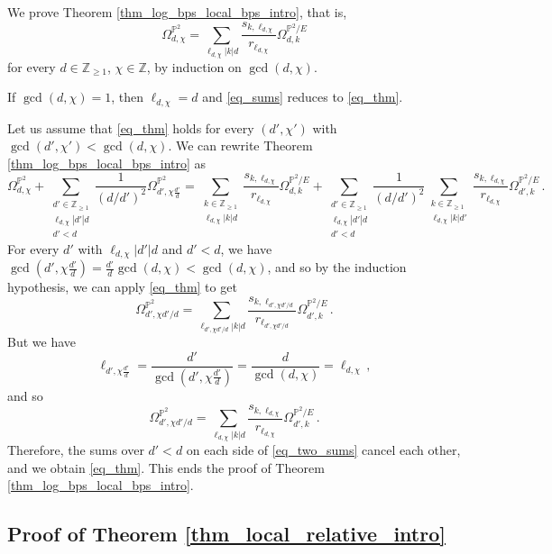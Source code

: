 \documentclass[11pt,letterpaper]{amsart}
\newcommand\PP{\mathbb P}
\newcommand\Z{\mathbb Z}
\begin{document}
We prove Theorem \ref{thm_log_bps_local_bps_intro}, that is, 
\begin{equation} \label{eq_thm}
\Omega_{d,\chi}^{\PP^2}=\sum_{\ell_{d,\chi}|k|d}
\frac{s_{k,\ell_{d,\chi}}}{r_{\ell_{d,\chi}}} \Omega_{d,k}^{\PP^2/E}
\end{equation}
for every $d \in \Z_{\geq 1}$, $\chi \in \Z$, by
induction on $\gcd(d,\chi)$. 

If $\gcd(d,\chi)=1$, then $\ell_{d,\chi}=d$ and \eqref{eq_sums} reduces to 
\eqref{eq_thm}.

Let us assume that \eqref{eq_thm} holds for every $(d',\chi')$ with 
$\gcd(d',\chi') < \gcd(d,\chi)$. We can rewrite 
Theorem \ref{thm_log_bps_local_bps_intro} as
\begin{equation} \label{eq_two_sums}
\Omega_{d,\chi}^{\PP^2}+
 \sum_{\substack{d'\in \Z_{\geqslant 1}\\
\ell_{d,\chi}|d'|d \\ d'<d}} \frac{1}{(d/d')^2}
\Omega^{\PP^2}_{d',\chi \frac{d'}{d}}
= 
\sum_{\substack{k \in \Z_{\geqslant 1} \\ \ell_{d,\chi}|k|d}}
\frac{s_{k,\ell_{d,\chi}}}{r_{\ell_{d,\chi}}} 
\Omega^{\PP^2/E}_{d, k} 
+
\sum_{\substack{d'\in \Z_{\geqslant 1}\\
\ell_{d,\chi}|d'|d \\ d'<d}} \frac{1}{(d/d')^2}
\sum_{\substack{k \in \Z_{\geqslant 1} \\ \ell_{d,\chi}|k|d'}}
\frac{s_{k,\ell_{d,\chi}}}{r_{\ell_{d,\chi}}} 
\Omega^{\PP^2/E}_{d', k} \,.
\end{equation}
For every $d'$ with $\ell_{d,\chi}|d'|d$ and $d'<d$, we have $\gcd(d',\chi \frac{d'}{d})=\frac{d'}{d} \gcd(d,\chi) < \gcd(d,\chi)$, and so by the induction
hypothesis, we can apply \eqref{eq_thm} to get 
\[ \Omega_{d',\chi d'/d}^{\PP^2}=\sum_{\ell_{d',\chi d'/d}|k|d}
\frac{s_{k,\ell_{d',\chi d'/d}}}{r_{\ell_{d',\chi d'/d}}} \Omega_{d',k}^{\PP^2/E}\,.\]
But we have 
\[ \ell_{d',\chi \frac{d'}{d}}=\frac{d'}{\gcd(d',\chi \frac{d'}{d})}
= \frac{d}{\gcd(d,\chi)}=\ell_{d,\chi}\,,\]
and so 
\[ \Omega_{d',\chi d'/d}^{\PP^2}=\sum_{\ell_{d,\chi}|k|d}
\frac{s_{k,\ell_{d,\chi}}}{r_{\ell_{d,\chi}}} \Omega_{d',k}^{\PP^2/E}\,.\]
Therefore, the sums over $d'<d$ on each side of \eqref{eq_two_sums} cancel each other, and we obtain \eqref{eq_thm}. This ends the proof of Theorem \ref{thm_log_bps_local_bps_intro}.

\subsection{Proof of Theorem \ref{thm_local_relative_intro}}
\label{section_thm_local_relative_intro}
\end{document}
